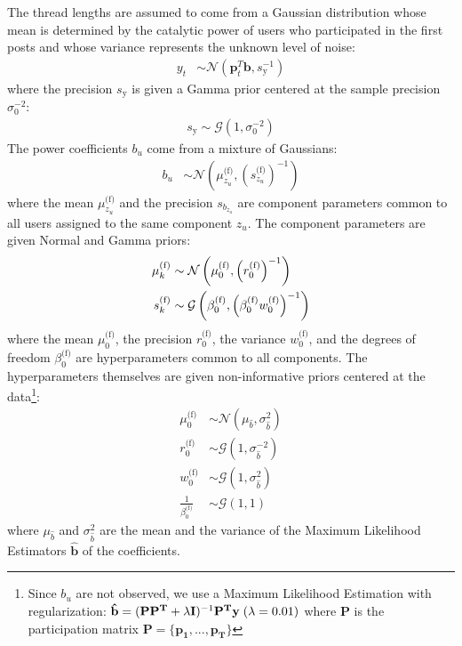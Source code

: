 \documentclass[smallextended]{svjour3}          %
\newcommand\alberto[1]{\textcolor{black}{#1}}
\newcommand{\muo}{\mu_{0}^\text{(f)}}
\newcommand{\ro}{r_{0}^\text{(f)}}
\newcommand{\invro}{\left(r_{0}^\text{(f)}\right)^{-1}}
\newcommand{\wo}{w_{0}^\text{(f)}}
\newcommand{\betaof}{\beta_{0}^\text{(f)}}
\newcommand{\muk}{\mu_{k}^\text{(f)}}
\newcommand{\sk}{s_{k}^\text{(f)}}
\newcommand{\invszu}{\left(s_{z_u}^{\text{(f)}}\right)^{-1}}
\newcommand{\muzu}{\mu_{z_u}^\text{(f)}}
\begin{document}
The thread lengths are assumed to come from a Gaussian distribution whose mean is determined by the catalytic power of users who participated in the first posts and whose variance represents the unknown level of noise:
\begin{align}
y_t &\sim \mathcal{N}(\mathbf{p}_t^T \mathbf{b}, s_{\text{y}}^{-1})
\end{align}
where the precision $s_{\text{y}}$ is given a Gamma prior centered at the sample precision $\sigma_0^{-2}$:
\begin{align}
s_{\text{y}} \sim \mathcal{G}(1,\sigma_{\text{0}}^{-2})
\end{align}
The power coefficients $b_u$ come from a mixture of Gaussians:
\begin{align}
b_u &\sim \mathcal{N}\left(\muzu, \invszu\right)
\end{align}
where the mean $\muzu$ and the precision $s_{b_{z_u}}$ are component parameters common to all users assigned to the same component $z_u$. The component parameters are given Normal and Gamma priors:
\begin{align}
\muk &\sim  \mathcal{N}\left(\muo, \invro \right)\\
\sk &\sim  \mathcal{G}\left( \betaof, \alberto{\left(\betaof\wo\right)^{-1}}\right) 
\end{align}
where the mean $\muo$, the precision $\ro$, the variance $\wo$, and the degrees of freedom $\betaof$ are hyperparameters common to all components. The hyperparameters themselves are given non-informative priors centered at the  data{\footnote{Since $b_u$ are not observed, we use a Maximum Likelihood Estimation with regularization: $\mathbf{\mathbf{\hat{b}}} = (\mathbf{P}\mathbf{P^T} + \lambda\mathbf{I})^{-1} \mathbf{P^T y} \;(\alberto{ \lambda=0.01})$ where $\mathbf{P}$ is the participation matrix $\mathbf{P} = \{\mathbf{p_1},...,\mathbf{p_T}\}$}}:
\begin{align}
\muo &\sim \mathcal{N}(\mu_{\hat{b}}, \sigma_{\hat{b}}^2) \\
\ro &\sim \mathcal{G}(1, \sigma_{\hat{b}}^{-2})\\
\wo  &\sim \mathcal{G}(1, \sigma_{\hat{b}}^{2})\\
\frac{1}{\betaof}&\sim \mathcal{G}(1, 1)
\end{align}
where $\mu_{\hat{b}}$ and $\sigma_{\hat{b}}^2$ are the mean and the variance of the Maximum Likelihood Estimators $\mathbf{\hat{b}}$ of the coefficients. 

\end{document}
